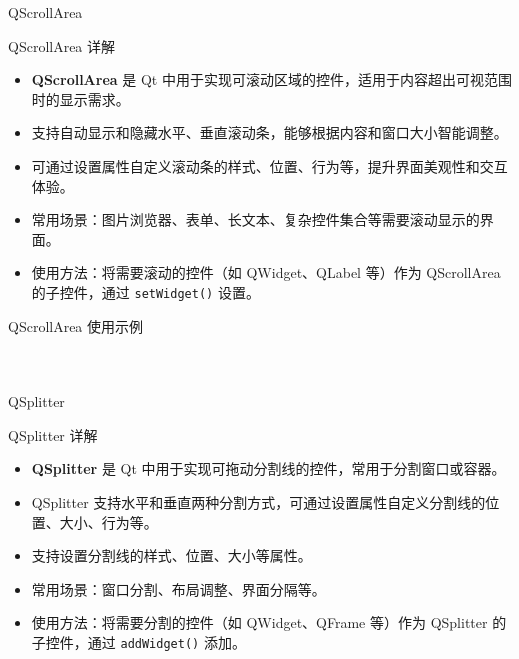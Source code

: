 \documentclass[UTF8,aspectratio=169]{beamer}
\begin{document}
\begin{frame}{QScrollArea}
    \begin{ytublock}{QScrollArea 详解}
        \begin{itemize}
            \item \textbf{QScrollArea} 是 Qt 中用于实现可滚动区域的控件，适用于内容超出可视范围时的显示需求。
            \item 支持自动显示和隐藏水平、垂直滚动条，能够根据内容和窗口大小智能调整。
            \item 可通过设置属性自定义滚动条的样式、位置、行为等，提升界面美观性和交互体验。
            \item 常用场景：图片浏览器、表单、长文本、复杂控件集合等需要滚动显示的界面。
            \item 使用方法：将需要滚动的控件（如 QWidget、QLabel 等）作为 QScrollArea 的子控件，通过 \texttt{setWidget()} 设置。
        \end{itemize}
    \end{ytublock}
\end{frame}

\begin{frame}[fragile]{QScrollArea 使用示例}
    \begin{columns}
        \begin{column}{0.48\textwidth}
            \inputminted[firstline=1,lastline=21]{cpp}{code/qt_scrollarea_example.cpp}
        \end{column}
        \begin{column}{0.48\textwidth}
            \inputminted[firstline=22,lastline=40]{cpp}{code/qt_scrollarea_example.cpp}
        \end{column}
    \end{columns}
\end{frame}

\begin{frame}{QSplitter}
    \begin{ytublock}{QSplitter 详解}
        \begin{itemize}
            \item \textbf{QSplitter} 是 Qt 中用于实现可拖动分割线的控件，常用于分割窗口或容器。
            \item QSplitter 支持水平和垂直两种分割方式，可通过设置属性自定义分割线的位置、大小、行为等。
            \item 支持设置分割线的样式、位置、大小等属性。
            \item 常用场景：窗口分割、布局调整、界面分隔等。
            \item 使用方法：将需要分割的控件（如 QWidget、QFrame 等）作为 QSplitter 的子控件，通过 \texttt{addWidget()} 添加。
        \end{itemize}
    \end{ytublock}
\end{frame}
\end{document}

